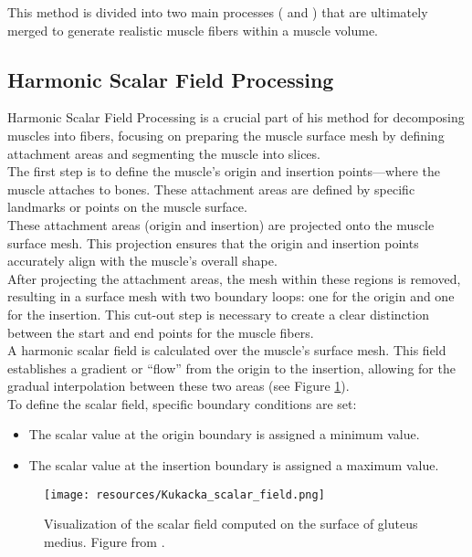 \documentclass[english, bc, kiv, he, iso690alph, pdf, viewonly]{fasthesis}
\begin{document}
This method is divided into two main processes (\textbf{} and 
\textbf{}) that are ultimately merged to generate realistic muscle fibers within a muscle volume.

\subsection{Harmonic Scalar Field Processing}
\label{subsec:kk_harmonic_scalar_field}

Harmonic Scalar Field Processing is a crucial part of his method for decomposing muscles into fibers, focusing on preparing the muscle surface mesh by defining attachment areas and segmenting the muscle into slices. \\

The first step is to define the muscle's origin and insertion points—where the muscle attaches to bones. These attachment areas are defined by specific landmarks or points on the muscle surface. \\

These attachment areas (origin and insertion) are projected onto the muscle surface mesh. This projection ensures that the origin and insertion points accurately align with the muscle's overall shape.\\

After projecting the attachment areas, the mesh within these regions is removed, resulting in a surface mesh with two boundary loops: one for the origin and one for the insertion. This cut-out step is necessary to create a clear distinction between the start and end points for the muscle fibers. \\

A harmonic scalar field is calculated over the muscle’s surface mesh. This field establishes a gradient or “flow” from the origin to the insertion, allowing for the gradual interpolation between these two areas (see Figure \ref{fig:Kukacka_scalar_field}).
\\
To define the scalar field, specific boundary conditions are set:
\begin{itemize}
	\item The scalar value at the origin boundary is assigned a minimum value. 
	\item The scalar value at the insertion boundary is assigned a maximum value. 
\end{itemize}

\begin{figure}[h!]
	\centering
	\begin{minipage}[b]{0.8\textwidth}
		\centering
		\texttt{[image: resources/Kukacka\_scalar\_field.png]}
    \end{minipage}
	\caption{Visualization of the scalar field computed on the surface of gluteus medius. Figure from \cite{KK14}.}
	\label{fig:Kukacka_scalar_field}
\end{figure}
\end{document}
